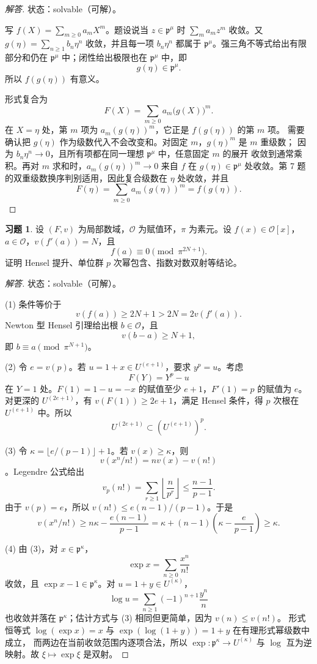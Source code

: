 \documentclass[11pt,a4paper,openany]{ctexbook}
\numberwithin{equation}{chapter}
\theoremstyle{plain}
\theoremstyle{definition}
\newtheorem{exercise}[theorem]{习题}
\theoremstyle{remark}
\begin{document}
\begin{proof}[解答]
状态：solvable（可解）。

写 $f(X)=\sum_{m\ge0}a_mX^m$。题设说当 $z\in\mathfrak p^\mu$ 时
$\sum_m a_mz^m$ 收敛。又 $g(\eta)=\sum_{n\ge1}b_n\eta^n$ 收敛，并且每一项
$b_n\eta^n$ 都属于 $\mathfrak p^\mu$。强三角不等式给出有限部分和仍在
$\mathfrak p^\mu$ 中；闭性给出极限也在 $\mathfrak p^\mu$ 中，即
\[
g(\eta)\in\mathfrak p^\mu.
\]
所以 $f(g(\eta))$ 有意义。

形式复合为
\[
F(X)=\sum_{m\ge0}a_m\bigl(g(X)\bigr)^m.
\]
在 $X=\eta$ 处，第 $m$ 项为 $a_m(g(\eta))^m$，它正是 $f(g(\eta))$ 的第 $m$ 项。
需要确认把 $g(\eta)$ 作为级数代入不会改变和。对固定 $m$，$g(\eta)^m$ 是 $m$ 重级数；
因为 $b_n\eta^n\to0$，且所有项都在同一理想 $\mathfrak p^\mu$ 中，任意固定 $m$ 的展开
收敛到通常乘积。再对 $m$ 求和时，$a_m(g(\eta))^m\to0$ 来自 $f$ 在
$g(\eta)\in\mathfrak p^\mu$ 处收敛。第 7 题的双重级数换序判别适用，因此复合级数在
$\eta$ 处收敛，并且
\[
F(\eta)=\sum_{m\ge0}a_m(g(\eta))^m=f(g(\eta)).
\]
\end{proof}

\begin{exercise}
设 $(F,v)$ 为局部数域，$\mathcal O$ 为赋值环，$\pi$ 为素元。设 $f(x)\in\mathcal O[x]$，$a\in\mathcal O$，$v(f'(a))=N$，且
\[
f(a)\equiv0\pmod{\pi^{2N+1}}.
\]
证明 Hensel 提升、单位群 $p$ 次幂包含、指数对数双射等结论。
\end{exercise}

\begin{proof}[解答]
状态：solvable（可解）。

(1) 条件等价于
\[
v(f(a))\ge2N+1>2N=2v(f'(a)).
\]
Newton 型 Hensel 引理给出根 $b\in\mathcal O$，且
\[
v(b-a)\ge N+1,
\]
即 $b\equiv a\pmod{\pi^{N+1}}$。

(2) 令 $e=v(p)$。若 $u=1+x\in U^{(e+1)}$，要求 $y^p=u$。考虑
\[
F(Y)=Y^p-u
\]
在 $Y=1$ 处。$F(1)=1-u=-x$ 的赋值至少 $e+1$，$F'(1)=p$ 的赋值为 $e$。对更深的 $U^{(2e+1)}$，有 $v(F(1))\ge2e+1$，满足 Hensel 条件，得 $p$ 次根在 $U^{(e+1)}$ 中。所以
\[
U^{(2e+1)}\subset (U^{(e+1)})^p.
\]

(3) 令 $\kappa=\lfloor e/(p-1)\rfloor+1$。若 $v(x)\ge\kappa$，则
\[
v(x^n/n!)=nv(x)-v(n!)
\]
。Legendre 公式给出
\[
v_p(n!)=\sum_{r\ge1}\left\lfloor\frac n{p^r}\right\rfloor\le\frac{n-1}{p-1}.
\]
由于 $v(p)=e$，所以 $v(n!)\le e(n-1)/(p-1)$。于是
\[
v(x^n/n!)\ge n\kappa-\frac{e(n-1)}{p-1}
=\kappa+(n-1)\left(\kappa-\frac e{p-1}\right)\ge\kappa.
\]

(4) 由 (3)，对 $x\in\mathfrak p^\kappa$，
\[
\exp x=\sum_{n\ge0}\frac{x^n}{n!}
\]
收敛，且 $\exp x-1\in\mathfrak p^\kappa$。对 $u=1+y\in U^{(\kappa)}$，
\[
\log u=\sum_{n\ge1}(-1)^{n+1}\frac{y^n}{n}
\]
也收敛并落在 $\mathfrak p^\kappa$；估计方式与 (3) 相同但更简单，因为 $v(n)\le v(n!)$。
形式恒等式 $\log(\exp x)=x$ 与 $\exp(\log(1+y))=1+y$ 在有理形式幂级数中成立，
而两边在当前收敛范围内逐项合法，所以 $\exp:\mathfrak p^\kappa\to U^{(\kappa)}$
与 $\log$ 互为逆映射。故 $\xi\mapsto\exp\xi$ 是双射。
\end{proof}
\end{document}
